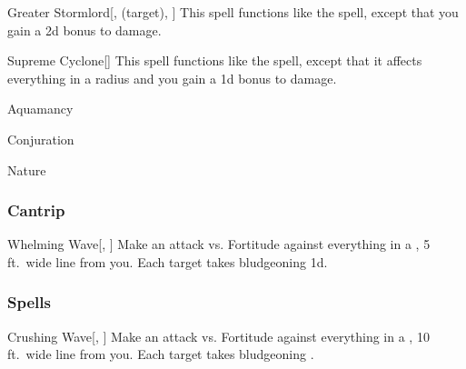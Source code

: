 \lowercase{\hypertarget{spell:Greater Stormlord}{}}\label{spell:Greater Stormlord}
\begin{attuneability}[\nth{6}]{\hypertarget{spell:Greater Stormlord}{Greater Stormlord}}[,  (target), ]
This spell functions like the  spell, except that you gain a \plus2d bonus to damage.
\end{attuneability}
\vspace{0.25em}



\lowercase{\hypertarget{spell:Supreme Cyclone}{}}\label{spell:Supreme Cyclone}
\begin{apability}[\nth{6}]{\hypertarget{spell:Supreme Cyclone}{Supreme Cyclone}}[]
This spell functions like the  spell, except that it affects everything in a \arealarge radius and you gain a \plus1d bonus to damage.
\end{apability}
\vspace{0.25em}


\newpage
\begin{spellsection}{Aquamancy}

\begin{spellheader}
\end{spellheader}


 Conjuration

 Nature

\subsubsection{Cantrip}


\begin{freeability}{Whelming Wave}[, ]
Make an attack vs. Fortitude against everything in a \areamed, 5 ft.\ wide line from you.
\hit Each target takes bludgeoning  \minus1d.
\end{freeability}

\end{spellsection}


\subsubsection{Spells}


\lowercase{\hypertarget{spell:Crushing Wave}{}}\label{spell:Crushing Wave}
\begin{apability}[\nth{1}]{\hypertarget{spell:Crushing Wave}{Crushing Wave}}[, ]
Make an attack vs. Fortitude against everything in a \arealarge, 10 ft.\ wide line from you.
\hit Each target takes bludgeoning .
\end{apability}
\vspace{0.25em}




